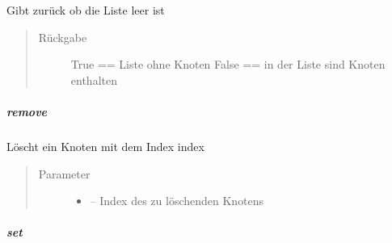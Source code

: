\documentclass[letterpaper,10pt,ngerman]{sphinxmanual}
\begin{document}
\begin{fulllineitems}
\label{\detokenize{com/linuxluigi/edu/list/Listlabel:com.linuxluigi.edu.list.Listlabel.isEmpty()}}
Gibt zurück ob die Liste leer ist
\begin{quote}\begin{description}
\item[{Rückgabe}] \leavevmode
True == Liste ohne Knoten False == in der Liste sind Knoten enthalten

\end{description}\end{quote}

\end{fulllineitems}



\subparagraph{remove}
\label{\detokenize{com/linuxluigi/edu/list/Listlabel:remove}}

\begin{fulllineitems}
\label{\detokenize{com/linuxluigi/edu/list/Listlabel:com.linuxluigi.edu.list.Listlabel.remove(int)}}
Löscht ein Knoten mit dem Index index
\begin{quote}\begin{description}
\item[{Parameter}] \leavevmode\begin{itemize}
\item {} 
 -- Index des zu löschenden Knotens

\end{itemize}

\end{description}\end{quote}

\end{fulllineitems}



\subparagraph{set}
\label{\detokenize{com/linuxluigi/edu/list/Listlabel:set}}
\end{document}
